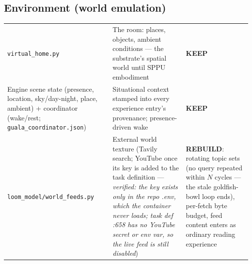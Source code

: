\documentclass[11pt]{article}
\newcommand{\keep}{\textbf{KEEP}}
\newcommand{\rebuild}{\textbf{REBUILD}}
\begin{document}
\subsection{Environment (world emulation)}
\begin{longtable}{p{} p{} p{}}
\toprule
\texttt{virtual\_home.py} &
The room: places, objects, ambient conditions — the substrate's spatial
world until SPPU embodiment &
\keep{} \\
Engine scene state (presence, location, sky/day-night, place, ambient) +
coordinator (wake/rest; \texttt{guala\_coordinator.json}) &
Situational context stamped into every experience entry's provenance;
presence-driven wake &
\keep{} \\
\texttt{loom\_model/world\_feeds.py} &
External world texture (Tavily search; YouTube once its key is added to
the task definition — \emph{verified: the key exists only in the repo
.env, which the container never loads; task def :658 has no YouTube
secret or env var, so the live feed is still disabled}) &
\rebuild{}: rotating topic sets (no query repeated within $N$ cycles — the
stale goldfish-bowl loop ends), per-fetch byte budget, feed content enters
as ordinary reading experience \\
\bottomrule
\end{longtable}
\end{document}
